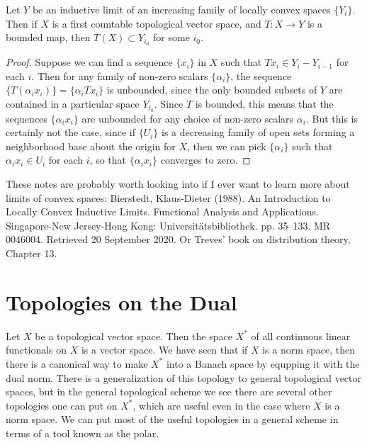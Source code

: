 \begin{theorem}
    Let $Y$ be an inductive limit of an increasing family of locally convex spaces $\{ Y_i \}$. Then if $X$ is a first countable topological vector space, and $T: X \to Y$ is a bounded map, then $T(X) \subset Y_{i_0}$ for some $i_0$.
\end{theorem}
\begin{proof}
    Suppose we can find a sequence $\{ x_i \}$ in $X$ such that $Tx_i \in Y_i - Y_{i-1}$ for each $i$. Then for any family of non-zero scalars $\{ \alpha_i \}$, the sequence $\{ T(\alpha_i x_i) \} = \{ \alpha_i Tx_i \}$ is unbounded, since the only bounded subsets of $Y$ are contained in a particular space $Y_{i_0}$. Since $T$ is bounded, this means that the sequences $\{ \alpha_i x_i \}$ are unbounded for any choice of non-zero scalars $\alpha_i$. But this is certainly not the case, since if $\{ U_i \}$ is a decreasing family of open sets forming a neighborhood base about the origin for $X$, then we can pick $\{ \alpha_i \}$ such that $\alpha_i x_i \in U_i$ for each $i$, so that $\{ \alpha_i x_i \}$ converges to zero.
\end{proof}

These notes are probably worth looking into if I ever want to learn more about limits of convex spaces: Bierstedt, Klaus-Dieter (1988). An Introduction to Locally Convex Inductive Limits. Functional Analysis and Applications. Singapore-New Jersey-Hong Kong: Universitätsbibliothek. pp. 35–133. MR 0046004. Retrieved 20 September 2020. Or Treves' book on distribution theory, Chapter 13.

\section{Topologies on the Dual}

Let $X$ be a topological vector space. Then the space $X^*$ of all continuous linear functionals on $X$ is a vector space. We have seen that if $X$ is a norm space, then there is a canonical way to make $X^*$ into a Banach space by equpping it with the dual norm. There is a generalization of this topology to general topological vector spaces, but in the general topological scheme we see there are several other topologies one can put on $X^*$, which are useful even in the case where $X$ is a norm space. We can put most of the useful topologies in a general scheme in terms of a tool known as the polar.

